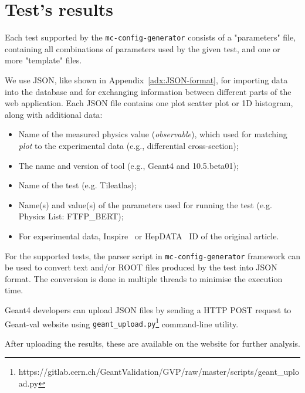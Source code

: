 


\section{Test's results}

Each test supported by the {\tt mc-config-generator} consists of a "parameters" file, containing all combinations of parameters used by the given test, and one or more "template" files.

We use JSON, like shown in Appendix~\ref{adx:JSON-format}, for importing data into the database and for exchanging information between different parts of the web application. Each JSON file contains one plot scatter plot or 1D histogram, along with additional data:

\begin{itemize}
    \item Name of the measured physics value (\textit{observable}), which used for matching \textit{plot} to the experimental data (e.g., differential cross-section);
    \item The name and version of tool (e.g., Geant4 and 10.5.beta01);
    \item Name of the test (e.g. Tileatlas);
    \item Name(s) and value(s) of the parameters used for running the test (e.g. Physics List: FTFP\_BERT);
    \item For experimental data, Inspire~\cite{inspire} or HepDATA~\cite{hepdata} ID of the original article.
\end{itemize}

For the supported tests, the parser script in {\tt mc-config-generator} framework can be used to convert text and/or ROOT files produced by the test into JSON format. The conversion is done in multiple threads to minimise the execution time.

Geant4 developers can upload JSON files by sending a HTTP POST request to \textsf{Geant-val} website using {\tt geant\_upload.py}\footnote{https://gitlab.cern.ch/GeantValidation/GVP/raw/master/scripts/geant\_upload.py} command-line utility.

After uploading the results, these are available on the website for further analysis.


